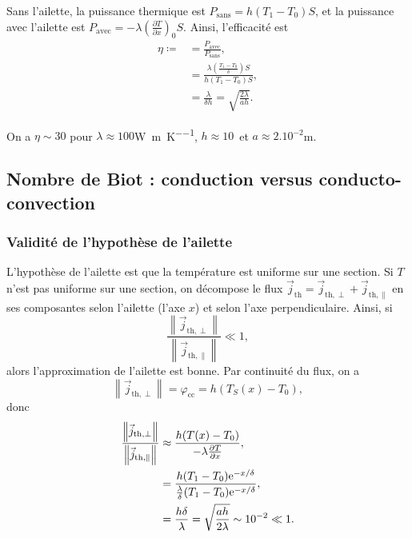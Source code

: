             Sans l'ailette, la puissance thermique est $P_{\text{sans}}=h(T_1-T_0)S$, et la puissance avec l'ailette est $P_{\text{avec}}=-\lambda\left(\frac{\partial T}{\partial x}\right)_{0}S$. Ainsi, l'efficacité est 
            \begin{align}
                \eta\coloneqq
                &=
                \frac{P_{\text{avec}}}{P_{\text{sans}}},\\
                &=
                \frac{\lambda\left(\frac{T_1-T_0}{\delta}\right)S}{h(T_1-T_0)S},\\
                &=
                \frac{\lambda}{\delta h}=\sqrt{\frac{2\lambda}{ah}}.
            \end{align}

            On a $\eta\sim 30$ pour $\lambda\approx100$\si[]{\watt\per\metre\per\kelvin}, $h\approx10$\si[]{\watt\per\metre\square} et $a\approx2.10^{-2}$\si[]{\metre}.

    \subsection[Nombre de Biot]{Nombre de Biot : conduction versus conducto-convection}
        \subsubsection{Validité de l'hypothèse de l'ailette}
            L'hypothèse de l'ailette est que la température est uniforme sur une section. Si $T$ n'est pas uniforme sur une section, on décompose le flux $\vec{j}_{\text{th}}=\vec{j}_{\text{th},\perp}+\vec{j}_{\text{th},\parallel}$ en ses composantes selon l'ailette (l'axe $x$) et selon l'axe perpendiculaire. Ainsi, si 
            \begin{equation}
                \frac{\left\lVert\vec{j}_{\text{th},\perp}\right\rVert}{\left\lVert\vec{j}_{\text{th},\parallel}\right\rVert}\ll1,
            \end{equation}
            alors l'approximation de l'ailette est bonne. Par continuité du flux, on a 
            \begin{equation}
                \left\lVert\vec{j}_{\text{th},\perp}\right\rVert=\varphi_{\text{cc}}=h(T_S(x)-T_0),
            \end{equation}
            donc
            \begin{align}
                \frac{\left\lVert\vec{j}_{\text{th},\perp}\right\rVert}{\left\lVert\vec{j}_{\text{th},\parallel}\right\rVert}
                &\approx
                \frac{h(T(x)-T_0)}{-\lambda\frac{\partial T}{\partial x}},\\
                &=
                \frac{h(T_1-T_0)\mathrm{e}^{-x/\delta}}{\frac{\lambda}{\delta}(T_1-T_0)\mathrm{e}^{-x/\delta}},\\
                &=
                \frac{h\delta}{\lambda}=\sqrt{\frac{ah}{2\lambda}}\sim10^{-2}\ll1.
            \end{align}


